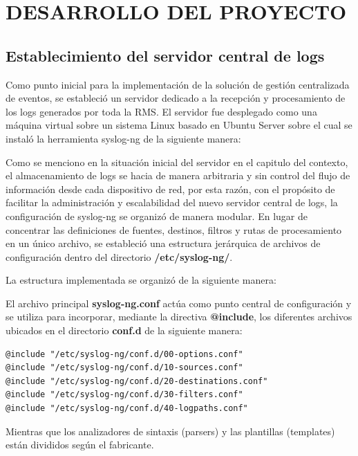 \chapter{DESARROLLO DEL PROYECTO}

\section{Establecimiento del servidor central de logs}
Como punto inicial para la implementación de la solución de gestión centralizada de eventos, se estableció un servidor dedicado a la recepción y procesamiento de los logs generados por toda la RMS. El servidor fue desplegado como una máquina virtual sobre un sistema Linux basado en Ubuntu Server sobre el cual se instaló la herramienta syslog-ng de la siguiente manera:



Como se menciono en la situación inicial del servidor en el capitulo del contexto, el almacenamiento de logs se hacia de manera arbitraria y sin control del flujo de información desde cada dispositivo de red, por esta razón, con el propósito de facilitar la administración y escalabilidad del nuevo servidor central de logs, la configuración de syslog-ng se organizó de manera modular. En lugar de concentrar las definiciones de fuentes, destinos, filtros y rutas de procesamiento en un único archivo, se estableció una estructura jerárquica de archivos de configuración dentro del directorio \textbf{/etc/syslog-ng/}.

La estructura implementada se organizó de la siguiente manera:



El archivo principal \textbf{syslog-ng.conf} \label{sec:syslog-ng.conf} actúa como punto central de configuración y se utiliza para incorporar, mediante la directiva \textbf{@include}, los diferentes archivos ubicados en el directorio \textbf{conf.d} de la siguiente manera:

\begin{lstlisting}[style=logstyle]
@include "/etc/syslog-ng/conf.d/00-options.conf"
@include "/etc/syslog-ng/conf.d/10-sources.conf"
@include "/etc/syslog-ng/conf.d/20-destinations.conf"
@include "/etc/syslog-ng/conf.d/30-filters.conf"
@include "/etc/syslog-ng/conf.d/40-logpaths.conf"
\end{lstlisting}

Mientras que los analizadores de sintaxis (parsers) y las plantillas (templates) están divididos según el fabricante.

